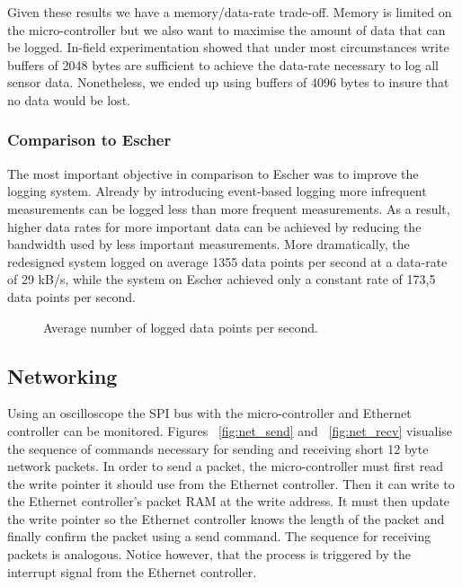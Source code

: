 Given these results we have a memory/data-rate trade-off. Memory is limited on the micro-controller but we also want to maximise the amount of data that can be logged. In-field experimentation showed that under most circumstances write buffers of 2048 bytes are sufficient to achieve the data-rate necessary to log all sensor data. Nonetheless, we ended up using buffers of 4096 bytes to insure that no data would be lost.

\subsubsection{Comparison to Escher}

The most important objective in comparison to Escher was to improve the logging system. Already by introducing event-based logging more infrequent measurements can be logged less than more frequent measurements. As a result, higher data rates for more important data can be achieved by reducing the bandwidth used by less important measurements. More dramatically, the redesigned system logged on average 1355 data points per second at a data-rate of 29 kB/s, while the system on Escher achieved only a constant rate of 173,5 data points per second.

\begin{figure}[H]
\centering
{}
\caption{Average number of logged data points per second.}
\label{fig:write_speed}
\end{figure}

\subsection{Networking}

Using an oscilloscope the SPI bus with the micro-controller and Ethernet controller can be monitored. Figures ~\ref{fig:net_send} and ~\ref{fig:net_recv} visualise the sequence of commands necessary for sending and receiving short 12 byte network packets. In order to send a packet, the micro-controller must first read the write pointer it should use from the Ethernet controller. Then it can write to the Ethernet controller's packet RAM at the write address. It must then update the write pointer so the Ethernet controller knows the length of the packet and finally confirm the packet using a send command. The sequence for receiving packets is analogous. Notice however, that the process is triggered by the interrupt signal from the Ethernet controller.

